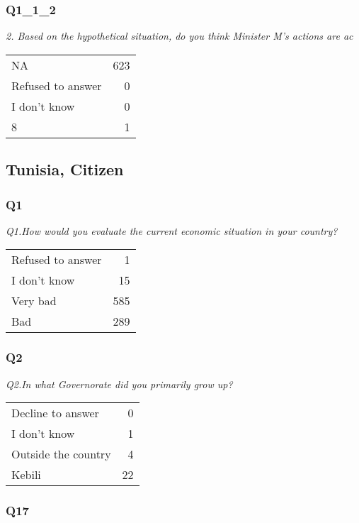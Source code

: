 \documentclass[
]{article}
\begin{document}
\hypertarget{q1_1_2-1}{%
\subsubsection{Q1\_1\_2}\label{q1_1_2-1}}

\textit{2. Based on the hypothetical situation, do you think Minister M’s actions are ac}

\begin{longtable}[]{@{}lr@{}}
\toprule
\endhead
NA & 623\tabularnewline
Refused to answer & 0\tabularnewline
I don't know & 0\tabularnewline
8 & 1\tabularnewline
\bottomrule
\end{longtable}

\hypertarget{tunisia-citizen}{%
\subsection{Tunisia, Citizen}\label{tunisia-citizen}}

\hypertarget{q1-2}{%
\subsubsection{Q1}\label{q1-2}}

\textit{Q1.How would you evaluate the current economic situation in your country?}

\begin{longtable}[]{@{}lr@{}}
\toprule
\endhead
Refused to answer & 1\tabularnewline
I don't know & 15\tabularnewline
Very bad & 585\tabularnewline
Bad & 289\tabularnewline
\bottomrule
\end{longtable}

\hypertarget{q2-2}{%
\subsubsection{Q2}\label{q2-2}}

\textit{Q2.In what Governorate did you primarily grow up?}

\begin{longtable}[]{@{}lr@{}}
\toprule
\endhead
Decline to answer & 0\tabularnewline
I don't know & 1\tabularnewline
Outside the country & 4\tabularnewline
Kebili & 22\tabularnewline
\bottomrule
\end{longtable}

\hypertarget{q17}{%
\subsubsection{Q17}\label{q17}}
\end{document}
